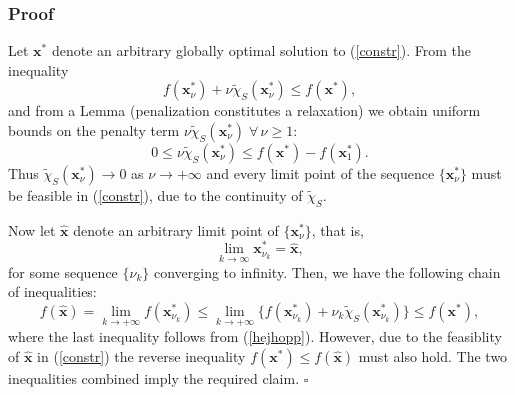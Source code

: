 \documentclass[12pt, a4paper]{article}
\begin{document}
\subsubsection*{Proof}
Let $\bm{x}^*$ denote an arbitrary globally optimal solution to (\ref{constr}). From the inequality
\begin{equation}
\label{hejhopp}
    f(\bm{x}^*_{\nu})+\nu \tilde{\chi}_S(\bm{x}^*_{\nu})\leq f(\bm{x}^*),
\end{equation}
and from a Lemma (penalization constitutes a relaxation) we obtain uniform bounds on the penalty term $\nu \tilde{\chi}_S(\bm{x}^*_{\nu})\; \forall \, \nu \geq 1:$
\begin{equation*}
0\leq\nu\tilde{\chi}_S(\bm{x}^*_{\nu})\leq f(\bm{x}^*) - f(\bm{x}^*_1).
\end{equation*}
Thus $\tilde{\chi}_S(\bm{x}^*_{\nu}) \to 0$ as $\nu \to +\infty$ and every limit point of the sequence $\{\bm{x}^*_{\nu} \}$ must be feasible in (\ref{constr}), due to the continuity of $\tilde{\chi}_S$.

Now let $\hat{\bm{x}}$ denote an arbitrary limit point of $\{ \bm{x}^*_{\nu} \}$, that is,
\begin{equation*}
\lim_{k\to \infty} \bm{x}^*_{\nu_k} = \hat{\bm{x}},
\end{equation*}
for some sequence $\{ \nu_k \}$ converging to infinity. Then, we have the following chain of inequalities:
\begin{equation*}
    f(\hat{\bm{x}}) = \lim_{k \to + \infty}f(\bm{x}^*_{\nu_k}) \leq \lim_{k\to +\infty}\{ f(\bm{x}^*_{\nu_k})+\nu_k \tilde{\chi}_S(\bm{x}^*_{\nu_k})\} \leq f(\bm{x}^*),
\end{equation*}
where the last inequality follows from (\ref{hejhopp}). However, due to the feasiblity of $\hat{\bm{x}}$ in (\ref{constr}) the reverse inequality $f(\bm{x}^*) \leq f(\hat{\bm{x}})$ must also hold. The two inequalities combined imply the required claim. $\square$

%

\end{document}
